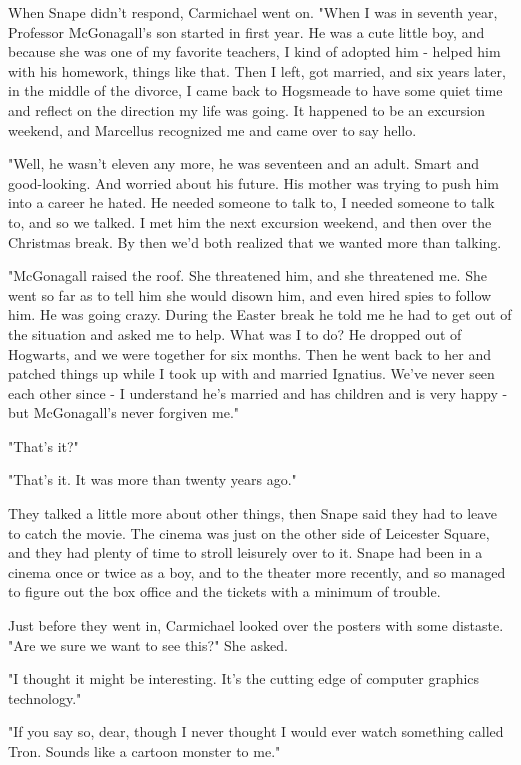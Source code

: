 \documentclass[a4paper,11pt]{article}
\begin{document}
When Snape didn't respond, Carmichael went on. "When I was in seventh year, Professor McGonagall's son started in first year. He was a cute little boy, and because she was one of my favorite teachers, I kind of adopted him - helped him with his homework, things like that. Then I left, got married, and six years later, in the middle of the divorce, I came back to Hogsmeade to have some quiet time and reflect on the direction my life was going. It happened to be an excursion weekend, and Marcellus recognized me and came over to say hello.

"Well, he wasn't eleven any more, he was seventeen and an adult. Smart and good-looking. And worried about his future. His mother was trying to push him into a career he hated. He needed someone to talk to, I needed someone to talk to, and so we talked. I met him the next excursion weekend, and then over the Christmas break. By then we'd both realized that we wanted more than talking.

"McGonagall raised the roof. She threatened him, and she threatened me. She went so far as to tell him she would disown him, and even hired spies to follow him. He was going crazy. During the Easter break he told me he had to get out of the situation and asked me to help. What was I to do? He dropped out of Hogwarts, and we were together for six months. Then he went back to her and patched things up while I took up with and married Ignatius. We've never seen each other since - I understand he's married and has children and is very happy - but McGonagall's never forgiven me."

"That's it?"

"That's it. It was more than twenty years ago."

They talked a little more about other things, then Snape said they had to leave to catch the movie. The cinema was just on the other side of Leicester Square, and they had plenty of time to stroll leisurely over to it. Snape had been in a cinema once or twice as a boy, and to the theater more recently, and so managed to figure out the box office and the tickets with a minimum of trouble.

Just before they went in, Carmichael looked over the posters with some distaste. "Are we sure we want to see this?" She asked.

"I thought it might be interesting. It's the cutting edge of computer graphics technology."

"If you say so, dear, though I never thought I would ever watch something called Tron. Sounds like a cartoon monster to me."
\end{document}
